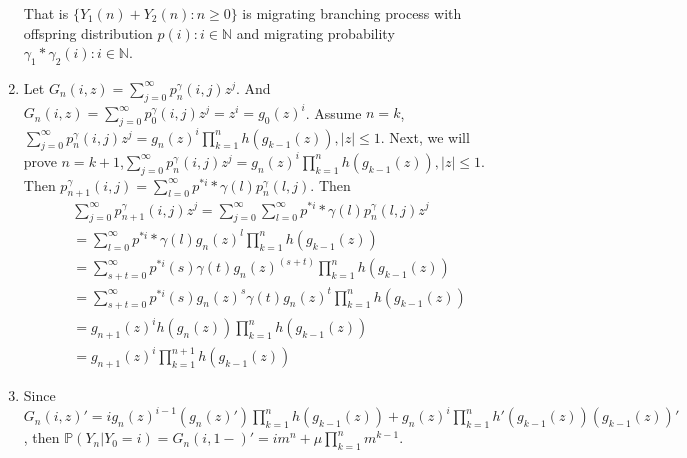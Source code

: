 \documentclass{ctexart}
\begin{document}
\begin{enumerate}
    That is \(\{Y_1(n )+ Y_2(n): n \geq 0\}\) is migrating branching process with offspring distribution \(p(i): i \in \mathbb{N}\)
    and migrating probability \(\gamma_1 * \gamma_2(i): i \in \mathbb{N}\).
  \item Let \(G_n(i,z)=\sum_{j=0}^{\infty} p_n^\gamma(i,j)z^j\). And \(G_n(i,z)=\sum_{j=0}^{\infty} p_0^\gamma(i,j)z^j=z^i=g_0(z)^i\).
    Assume \(n=k\),\(        \sum_{j=0}^{\infty} p_n^\gamma(i,j)z^j = g_n(z)^i \prod_{k=1}^{n} h(g_{k-1}(z)), |z| \leq 1\). Next, we will
    prove \(n=k + 1\),\(        \sum_{j=0}^{\infty} p_n^\gamma(i,j)z^j = g_n(z)^i \prod_{k=1}^{n} h(g_{k-1}(z)), |z| \leq 1\).
    Then \(p_{n + 1}^\gamma(i,j)=\sum_{l=0}^{\infty} p^{*i}*\gamma(l)p_n^\gamma(l,j)\).
    Then \[
      \begin{aligned}
         & \sum_{j=0}^{\infty} p_{n + 1}^\gamma(i,j)z^j = \sum_{j=0}^{\infty} \sum_{l=0}^{\infty} p^{*i}*\gamma(l)p_n^{\gamma}(l,j)z^j
        \\        & =\sum_{l=0}^{\infty} p^{*i}*\gamma(l)g_n(z)^l \prod_{k=1}^{n} h(g_{k-1}(z))
        \\        & =\sum_{s+t=0}^{\infty} p^{*i}(s)\gamma(t)g_n(z)^{(s + t)} \prod_{k=1}^{n} h(g_{k-1}(z))
        \\        & =\sum_{s+t=0}^{\infty} p^{*i}(s)g_n(z)^{s}\gamma(t)g_n(z)^t \prod_{k=1}^{n} h(g_{k-1}(z))
        \\        & =g_{n + 1}(z)^{i}h(g_n(z)) \prod_{k=1}^{n} h(g_{k-1}(z))
        \\&        =g_{n + 1}(z)^{i}\prod_{k=1}^{n + 1} h(g_{k-1}(z))
      \end{aligned}
    \]
  \item Since \(G_n(i,z)'=ig_n(z)^{i-1}(g_n(z)')\prod_{k=1}^{n}h(g_{k -1}(z)) + g_n(z)^i \prod_{k=1}^{n} h'(g_{k-1}(z))(g_{k-1}(z))' \), then
    \(\mathbb{P}(Y_n|Y_0=i)=G_n(i,1-)'=im^n + \mu \prod_{k=1}^{n} m^{k -1}\).
\end{enumerate}
\end{document}
